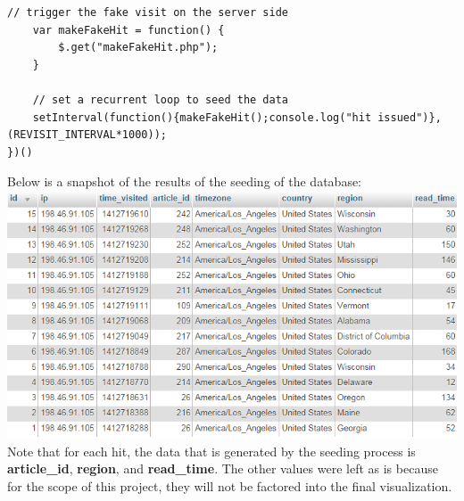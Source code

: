 \documentclass[12pt]{article}
\begin{document}
\begin{enumerate}
\begin{lstlisting}[basicstyle=\scriptsize]
	// trigger the fake visit on the server side
	var makeFakeHit = function() {
		$.get("makeFakeHit.php");
	}
	
	// set a recurrent loop to seed the data
	setInterval(function(){makeFakeHit();console.log("hit issued")},(REVISIT_INTERVAL*1000));
})()
\end{lstlisting}
\end{enumerate}

\noindent Below is a snapshot of the results of the seeding of the database: \\

\noindent\includegraphics[scale=0.8]{img/seeder_mock_hits} \\

\noindent Note that for each hit, the data that is generated by the seeding process is \textbf{article\_id}, \textbf{region}, and \textbf{read\_time}. The other values were left as is because for the scope of this project, they will not be factored into the final visualization. 

\vfill
\end{document}
